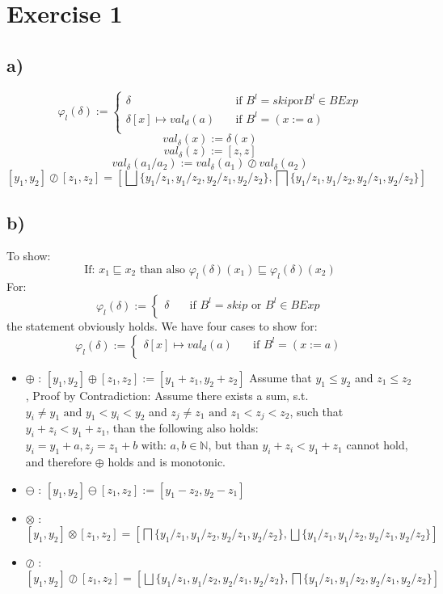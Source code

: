 \documentclass[fleqn,12pt]{article}
\begin{document}
\section*{Exercise 1}
\subsection*{a)}
\[ \varphi_l(\delta) :=
  \begin{cases}
    \delta       & \quad \text{if } B^l = skip \text{or} B^l \in BExp\\
    \delta [x] \mapsto val_d(a) & \quad \text{if } B^l=(x:=a)\\
  \end{cases}
\]
$$val_{\delta}(x):=\delta (x)$$
$$val_{\delta}(z):=[z,z]$$
$$val_{\delta}(a_1/a_2):=val_{\delta}(a_1) \oslash val_{\delta}(a_2)$$
$$[y_1,y_2] \oslash [z_1,z_2]=[\bigsqcup\{y_1/z_1,y_1/z_2,y_2/z_1,y_2/z_2\},\bigsqcap\{y_1/z_1,y_1/z_2,y_2/z_1,y_2/z_2\}]$$
\subsection*{b)}
To show:
$$\text{If: }x_1 \sqsubseteq x_2 \text{ than also } \varphi_l(\delta)(x_1) \sqsubseteq \varphi_l(\delta)(x_2)$$
For:
\[ \varphi_l(\delta) :=
  \begin{cases}
    \delta       & \quad \text{if } B^l = skip \text{ or } B^l \in BExp\\
  \end{cases}
\]
the statement obviously holds.
We have four cases to show for:
\[ \varphi_l(\delta) :=
  \begin{cases}
    \delta [x] \mapsto val_d(a) & \quad \text{if } B^l=(x:=a)\\
  \end{cases}
\]
\begin{itemize}
	\item{$\oplus$ :} $[y_1,y_2] \oplus [z_1,z_2] := [y_1+z_1,y_2+z_2]$ Assume that $y_1 \leq y_2$ and $z_1 \leq z_2$, Proof by Contradiction: Assume there exists a sum, s.t. $y_i \neq y_1 \text{ and } y_1<y_i<y_2$ and $z_j \neq z_1 \text{ and } z_1<z_j<z_2$, such that $y_i+z_i<y_1+z_1$, than the following also holds: $y_i=y_1+a,z_j=z_1+b \text{ with: } a,b\in \mathbb{N}$, but than $y_i+z_i<y_1+z_1$ cannot hold, and therefore $\oplus$ holds and is monotonic.
	\item{$\ominus$ :} $[y_1,y_2] \ominus [z_1,z_2] := [y_1-z_2,y_2-z_1]$
	\item{$\otimes$ :} $[y_1,y_2] \otimes [z_1,z_2]=[\bigsqcap\{y_1/z_1,y_1/z_2,y_2/z_1,y_2/z_2\},\bigsqcup\{y_1/z_1,y_1/z_2,y_2/z_1,y_2/z_2\}]$
	\item{$\oslash$ :} $[y_1,y_2] \oslash [z_1,z_2]=[\bigsqcup\{y_1/z_1,y_1/z_2,y_2/z_1,y_2/z_2\},\bigsqcap\{y_1/z_1,y_1/z_2,y_2/z_1,y_2/z_2\}]$
\end{itemize}
\end{document}
